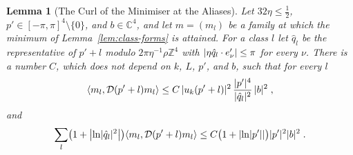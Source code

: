 \documentclass[11pt]{preprint}
\DeclarePairedDelimiter{\abs}{\lvert}{\rvert}
\numberwithin{equation}{section}
\newtheorem{lemma}[theorem]{Lemma}
\theoremstyle{definition}
\theoremstyle{remark}
\theoremstyle{plain}
\begin{document}
\begin{lemma}[The Curl of the Minimiser at the Aliases]\label{lem:alias-curl}
Let $32\eta \leq \frac12$, $p' \in [-\pi, \pi]^4 \setminus \{ 0 \}$, and $b \in \mathbb C^4$, and let $m = (m_l)$ be a family at which the minimum of Lemma~\ref{lem:class-forms} is attained. For a class $l$ let $\hat q_l$ be the representative of $p' + l$ modulo $2\pi\eta^{-1}\rho\mathbb Z^4$ with $\abs{\eta\hat q_l \cdot e'_\nu} \leq \pi$ for every $\nu$. There is a number $C$, which does not depend on $k$, $L$, $p'$, and $b$, such that for every $l$
\begin{equation}\label{eq:alias-curl}
    \langle m_l, \mathcal D(p' + l)m_l\rangle \leq C\,\abs{u_k(p' + l)}^2\,\frac{\abs{p'}^4}{\abs{\hat q_l}^2}\,\abs b^2\;,
\end{equation}
and
\begin{equation}\label{eq:alias-log}
    \sum_l\bigl(1 + \bigl\lvert\ln\abs{\hat q_l}^2\bigr\rvert\bigr)\langle m_l, \mathcal D(p' + l)m_l\rangle \leq C\bigl(1 + \abs{\ln\abs{p'}}\bigr)\abs{p'}^2\abs b^2\;.
\end{equation}
\end{lemma}
\end{document}
